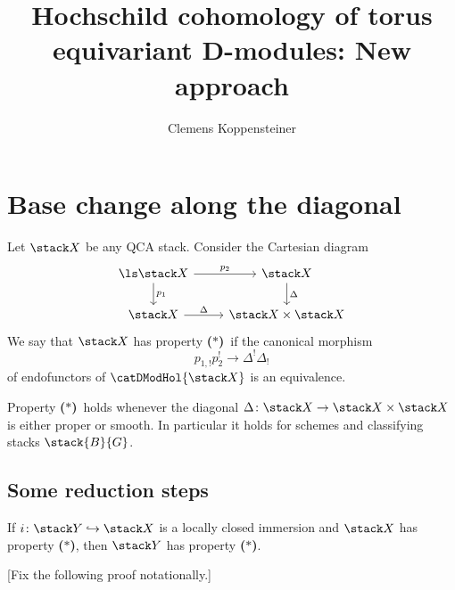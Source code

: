 \documentclass{ck-article}
\title{Hochschild cohomology of torus equivariant D-modules: New approach}
\author{Clemens Koppensteiner}
\newcommand\bc{\textbf{($\mathbf{*}$)}}
\newcommand\cs{\stack{B}}
\begin{document}
\maketitle

\section{Base change along the diagonal}

\begin{Def}
    Let $\stack X$ be any QCA stack.
    Consider the Cartesian diagram
    \[
        \begin{tikzcd}
            \ls \stack X \arrow[d, "p_1"] \arrow[r, "p_2"] & \stack X \arrow[d, "\Delta"] \\
            \stack X \arrow[r, "\Delta"] & \stack X \times \stack X
        \end{tikzcd}
    \]
    We say that $\stack X$ has property \bc\ if the canonical morphism
    \[
        p_{1,!}p_2^! \to \Delta^!\Delta_!
    \]
    of endofunctors of $\catDModHol{\stack X}$ is an equivalence.
\end{Def}

\begin{Lem}
    Property \bc\ holds whenever the diagonal $\Delta\colon \stack X \to \stack X \times \stack X$ is either proper or smooth.
    In particular it holds for schemes and classifying stacks $\cs{G}$.
\end{Lem}

\subsection{Some reduction steps}

\begin{Lem}\label{lem:bc_lc_immersion}
    If $i\colon\stack Y \hookrightarrow \stack X$ is a locally closed immersion and $\stack X$ has property \bc, then $\stack Y$ has property \bc.
\end{Lem}

[Fix the following proof notationally.]
\end{document}
